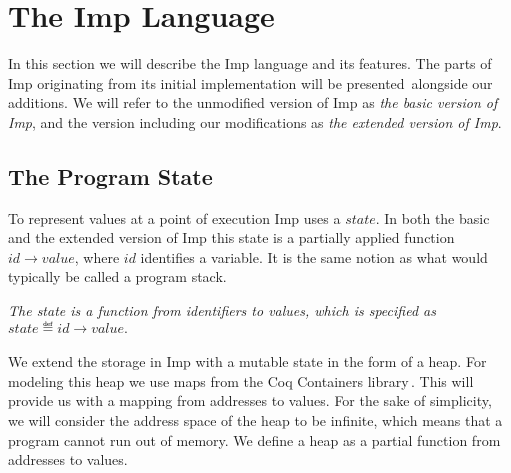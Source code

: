 \section{The Imp Language}
\label{sec:background_imp}
In this section we will describe the Imp language and its features. The parts of Imp originating from its initial implementation will be presented\,\cite{Pierce:SF} alongside our additions. We will refer to the unmodified version of Imp as \textit{the basic version of Imp}, and the version including our modifications as \textit{the extended version of Imp}.

\subsection{The Program State}
\label{sec:the_program_state}
To represent values at a point of execution Imp uses a $state$. In both the basic and the extended version of Imp this state is a partially applied function $id \to value$, where $id$ identifies a variable. It is the same notion as what would typically be called a program stack.

 \textit{The state is a function from identifiers to values, which is specified as }$state \eqdef id \to value.$

\paragraph{}
We extend the storage in Imp with a mutable state in the form of a heap. For modeling this heap we use maps from the Coq Containers library\,\cite{CoqContainers}. This will provide us with a mapping from addresses to values. For the sake of simplicity, we will consider the address space of the heap to be infinite, which means that a program cannot run out of memory. We define a heap as a partial function from addresses to values.

